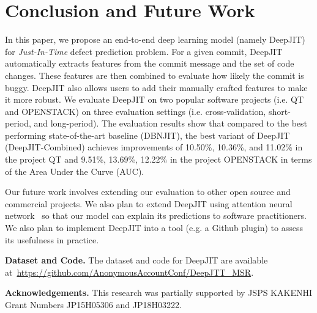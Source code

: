 \section{Conclusion and Future Work}
\label{sec:conclusion}
In this paper, we propose an end-to-end deep learning model (namely DeepJIT) for \emph{Just-In-Time} defect prediction problem. For a given commit, DeepJIT automatically extracts features from the commit message and the set of code changes. These features are then combined to evaluate how likely the commit is buggy. DeepJIT also allows users to add their manually crafted features to make it more robust. We evaluate DeepJIT on two popular software projects (i.e. QT and OPENSTACK) on three evaluation settings (i.e. cross-validation, short-period, and long-period). The evaluation results show that compared to the best performing state-of-the-art baseline (DBNJIT), the best variant of DeepJIT (DeepJIT-Combined) achieves improvements of 10.50\%, 10.36\%, and 11.02\% in the project QT and 9.51\%, 13.69\%, 12.22\% in the project OPENSTACK in terms of the Area Under the Curve (AUC).

Our future work involves extending our evaluation to other open source and commercial projects. We also plan to extend DeepJIT using attention neural network~\cite{yin2016abcnn} so that our model can explain its predictions to software practitioners. We also plan to implement DeepJIT into a tool (e.g. a Github plugin) to assess its usefulness in practice.

\noindent \textbf{Dataset and Code.} The dataset and code for DeepJIT are available at~\url{https://github.com/AnonymousAccountConf/DeepJTT_MSR}.

\noindent \textbf{Acknowledgements.} This research was partially supported by JSPS KAKENHI Grant Numbers JP15H05306 and JP18H03222.

